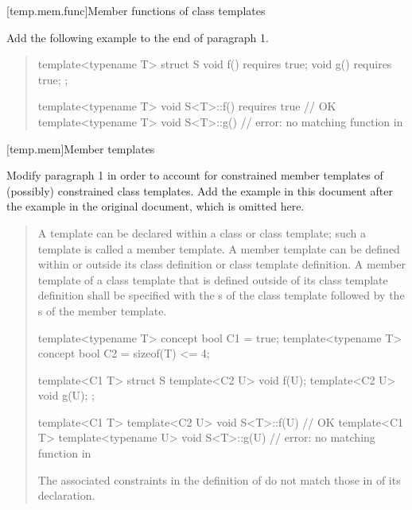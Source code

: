 [temp.mem.func]{Member functions of class templates}

Add the following example to the end of paragraph 1.

\begin{quote}
\begin{addedblock}
\enterexample
\begin{codeblock}
template<typename T> struct S {
  void f() requires true;
  void g() requires true;
};

template<typename T> 
  void S<T>::f() requires true { } // OK
template<typename T> 
  void S<T>::g() { }               // error: no matching function in 
\end{codeblock}
\exitexample
\end{addedblock}
\end{quote}


[temp.mem]{Member templates}

Modify paragraph 1 in order to account for constrained member templates
of (possibly) constrained class templates. Add the example in this
document after the example in the original document, which is omitted
here.

\begin{quote}
\pnum
A template can be declared within a class or class template; such a 
template is called a member template. 
% 
A member template can be defined within or outside its class definition 
or class template definition. 
% 
A member template of a class template that is defined outside of its 
class template definition shall be specified with the 
s 
of the class template followed by the 
s
of the member template.
% 
\enterexample
\begin{codeblock}
template<typename T> concept bool C1 = true;
template<typename T> concept bool C2 = sizeof(T) <= 4;

template<C1 T>
  struct S {
    template<C2 U> void f(U);
    template<C2 U> void g(U);
  };

template<C1 T> template<C2 U> 
  void S<T>::f(U) { } // OK
template<C1 T> template<typename U> 
  void S<T>::g(U) { } // error: no matching function in 
\end{codeblock}
The associated constraints in the definition of  do not
match those in of its declaration.
\exitexample
\end{quote}

